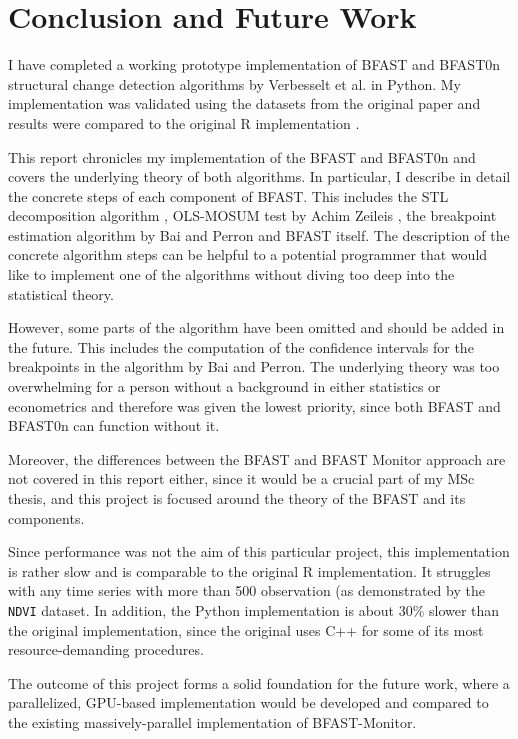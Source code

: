 \documentclass[main.tex]{subfiles}
\begin{document}
\chapter{Conclusion and Future Work}
\label{chap:conclusion_and_future_work}
I have completed a working prototype implementation of BFAST and BFAST0n
structural change detection algorithms by Verbesselt et al. \cite{bfast} in
Python. My implementation was validated using the datasets from the original
paper and results were compared to the original R implementation \cite{bfast-github}.

This report chronicles my implementation of the BFAST and BFAST0n and covers the
underlying theory of both algorithms. In particular, I describe in detail the
concrete steps of each component of BFAST. This includes the STL decomposition
algorithm \cite{stl}, OLS-MOSUM test by Achim Zeileis \cite{strucchange}, the
breakpoint estimation algorithm by Bai and Perron \cite{bai_perron} and BFAST
itself. The description of the concrete algorithm steps can be helpful to a
potential programmer that would like to implement one of the algorithms
without diving too deep into the statistical theory. 

However, some parts of the algorithm have been omitted and should be added in
the future. This includes the computation of the confidence intervals for the
breakpoints in the algorithm by Bai and Perron. The underlying theory was too
overwhelming for a person without a background in either statistics or
econometrics and therefore was given the lowest priority, since both BFAST and
BFAST0n can function without it.

Moreover, the differences between the BFAST and BFAST Monitor \cite{bfast_monitor}
approach are not covered in this report either, since it would be a crucial part of my
MSc thesis, and this project is focused around the theory of the BFAST and its components.

Since performance was not the aim of this particular project, this
implementation is rather slow and is comparable to the original R
implementation. It struggles with any time series with more than 500
observation (as demonstrated by the \texttt{NDVI} dataset. In addition, the Python
implementation is about 30\% slower than the original implementation, since
the original uses C++ for some of its most resource-demanding procedures.

The outcome of this project forms a solid foundation for
the future work, where a parallelized, GPU-based implementation would be
developed and compared to the existing massively-parallel implementation of BFAST-Monitor.

\biblio
\end{document}
